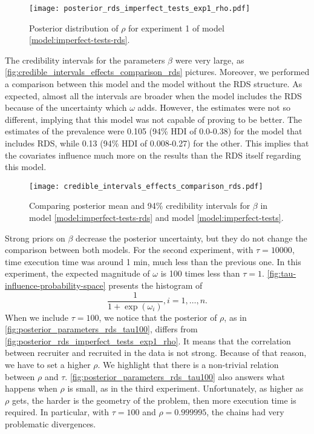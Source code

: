 \begin{figure}
  \centering
  \caption{\label{fig:posterior_rds_imperfect_tests_exp1_rho}Posterior distribution of
    $\rho$ for experiment 1 of model \eqref{model:imperfect-tests-rds}.}
  \texttt{[image: posterior\_rds\_imperfect\_tests\_exp1\_rho.pdf]}
\end{figure}

The credibility intervals for the parameters $\beta$ were very large, as
\autoref{fig:credible_intervals_effects_comparison_rds} pictures. Moreover, we
performed
a comparison between this model and the model without the RDS structure. As
expected, almost all the intervals are broader when the model includes the RDS
because of the uncertainty which $\omega$ adds. However, the estimates were
not so different, implying that this model was not capable of proving to be
better. The estimates of the prevalence were 0.105 (94\% HDI of 0.0-0.38) for
the model that includes RDS, while 0.13 (94\% HDI of 0.008-0.27) for the
other. This implies that the covariates influence much more on the results 
than the RDS itself regarding this model. 

\begin{figure}
  \centering
  \caption{\label{fig:credible_intervals_effects_comparison_rds}Comparing
  posterior mean and 94\% credibility intervals for $\beta$ in model
  \eqref{model:imperfect-tests-rds} and model \eqref{model:imperfect-tests}.}
  \texttt{[image: credible\_intervals\_effects\_comparison\_rds.pdf]}
\end{figure}

Strong priors on $\beta$ decrease the posterior uncertainty, but they do not
change the comparison between both models. For the second experiment, with
$\tau = 10000$, time execution time was around 1 min, much less than the
previous one. In this experiment, the expected magnitude of $\omega$ is
100 times less than $\tau = 1$. \autoref{fig:tau-influence-probability-space}
presents the histogram of 
$$
\frac{1}{1 + \exp(\omega_i)}, i = 1, \dots, n.
$$
When we include $\tau = 100$, we notice that the posterior of $\rho$, as in
\autoref{fig:posterior_parameters_rds_tau100}, differs from
\autoref{fig:posterior_rds_imperfect_tests_exp1_rho}. It means that the
correlation between recruiter and recruited in the data is not strong. Because
of that reason, we have to set a higher $\rho$. We highlight that there is a non-trivial
relation between $\rho$ and $\tau$.
\autoref{fig:posterior_parameters_rds_tau100} also answers what happens when
$\rho$ is small, as in the third experiment. Unfortunately, as higher as $\rho$
gets, the harder is the geometry of the problem, then more execution time is
required. In particular, with $\tau = 100$ and $\rho = 0.999995$, the chains had very problematic divergences.

